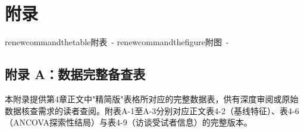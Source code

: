 \clearpage
{}
{}
\chapter*{附录}

renewcommand{thetable}{附表~-}
renewcommand{thefigure}{附图~-}

\section*{附录 A：数据完整备查表}

本附录提供第4章正文中"精简版"表格所对应的完整数据表，供有深度审阅或原始数据核查需求的读者查阅。附表A-1至A-3分别对应正文表4-2（基线特征）、表4-6（ANCOVA探索性结局）与表4-9（访谈受试者信息）的完整版本。

